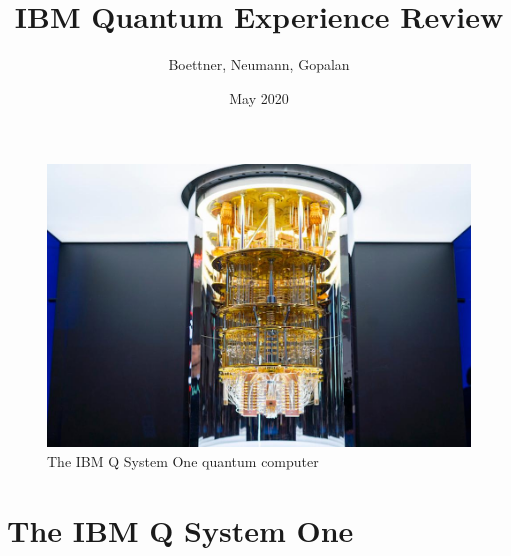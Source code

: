 \documentclass[12pt]{article}
\title{IBM Quantum Experience Review}
\author{Boettner, Neumann, Gopalan}
\date{May 2020}
\begin{document}
\maketitle
\begin{figure}[h!]
        \centering
        \includegraphics[width=\linewidth]{Circuits/ibm-q.jpg}
        \caption{The IBM Q System One quantum computer}
    \end{figure}
    \newpage
\section{The IBM Q System One}
    
\end{document}
